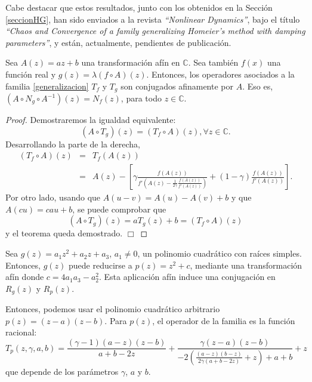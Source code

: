 Cabe destacar que estos resultados, junto con los obtenidos en la Sección \ref{seccionHG}, han sido enviados a la revista \textit{``Nonlinear Dynamics''}, bajo el título \textit{``Chaos and Convergence of a family generalizing Homeier's method with damping parameters''}, y están, actualmente, pendientes de publicación.

\begin{theorem}
	Sea $A(z)=a z+ b$ una transformación afín en $\mathbb{C}$.
	Sea también $f(x)$ una función real y $g(z)=\lambda(f\circ
	A)(z)$. Entonces, los operadores asociados a la familia \eqref{generalizacion}
	$T_f$ y $T_g$ son conjugados afinamente por $A$. Eso es, $\left(A\circ
	N_g\circ A^{-1}\right)(z)=N_f(z)$, para todo $z \in \mathbb{C}$.
\end{theorem}

\begin{proof} Demostraremos la igualdad equivalente:
	\[
	\left(A\circ T_g \right)(z)=\left(T_f\circ A\right)(z), \forall z \in \mathbb{C}.
	\]
	Desarrollando la parte de la derecha,
	\begin{eqnarray*}
		\left(T_f\circ A\right)(z)&=&T_f(A(z))\\
		&=& A(z)-\left[ \gamma \frac{f(A(z))}{f'\left(A(z)-\frac{1}{2\gamma}\frac{f(A(z))}{f'(A(z))}  \right)}+(1-\gamma)\frac{f(A(z))}{f'(A(z))}\right].
	\end{eqnarray*}
	Por otro lado, usando que $A(u-v)=A(u)-A(v)+b$ y que $A(c u)=c a u +b$, se puede comprobar que
	\begin{equation*}
	\left(A\circ T_g \right)(z)=a T_g(z)+b=\left(T_f\circ A\right)(z)
	\end{equation*}
	y el teorema queda demostrado. $\Box$
\end{proof}

\begin{theorem}
	Sea $g(z)=a_1 z^2+a_2 z+a_3$, $a_1\neq 0$, un polinomio cuadrático con raíces simples. Entonces, $g(z)$ puede reducirse a $p(z)=z^2+c$, mediante una transformación afín donde $c=4a_1a_3-a_2^2$. Esta aplicación afín induce una conjugación en $R_g(z)$ y $R_p(z)$.
\end{theorem}

Entonces, podemos usar el polinomio cuadrático arbitrario
$p(z)=(z-a)(z-b)$. Para $p(z)$, el operador de la familia es la función racional:
\begin{equation}
T_{p}(z,\gamma,a,b)=\frac{(\gamma -1) (a-z) (z-b)}{a+b-2 z}+\frac{\gamma  (z-a) (z-b)}{-2 \left(\frac{(a-z) (b-z)}{2 \gamma  (a+b-2 z)}+z\right)+a+b}+z
\end{equation}
que depende de los parámetros $\gamma$, $a$ y $b$.

